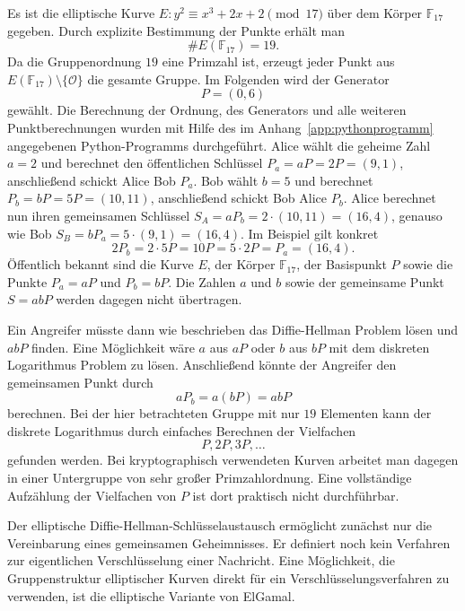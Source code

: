 \begin{beispiel}
    Es ist die elliptische Kurve \(E\colon y^2 \equiv x^3+2x+2 \pmod{17}\) über dem Körper \(\mathbb F_{17}\) gegeben. Durch explizite Bestimmung der Punkte erhält man
    \[
        \#E(\mathbb F_{17})=19.
    \]
    Da die Gruppenordnung \(19\) eine Primzahl ist, erzeugt jeder
    Punkt aus \(E(\mathbb F_{17})\setminus\{\mathcal O\}\) die gesamte
    Gruppe. Im Folgenden wird der Generator
    \[
        P=(0,6)
    \]
    gewählt. Die Berechnung der Ordnung, des Generators und alle weiteren Punktberechnungen wurden mit Hilfe des im Anhang~\ref{app:pythonprogramm} angegebenen Python-Programms durchgeführt. Alice wählt die geheime Zahl $a=2$ und berechnet den öffentlichen Schlüssel $P_a=aP=2P=(9,1)$, anschließend schickt Alice Bob $P_a$. Bob wählt $b=5$ und berechnet $P_b=bP=5P=(10,11)$, anschließend schickt Bob Alice $P_b$. Alice berechnet nun ihren gemeinsamen Schlüssel $S_A=aP_b=2\cdot(10,11)=(16,4)$, genauso wie Bob $S_B=bP_a=5\cdot(9,1)=(16,4)$.  Im Beispiel gilt konkret
    \[
        2P_b=2\cdot5P=10P=5\cdot2P=P_a=(16,4).
    \]
    Öffentlich bekannt sind die Kurve \(E\), der Körper
    \(\mathbb F_{17}\), der Basispunkt \(P\) sowie die Punkte
    \(P_a=aP\) und \(P_b=bP\). Die Zahlen \(a\) und \(b\) sowie der
    gemeinsame Punkt \(S=abP\) werden dagegen nicht übertragen.

    Ein Angreifer müsste dann wie beschrieben das Diffie-Hellman Problem lösen und \(abP\) finden. Eine Möglichkeit wäre \(a\) aus \(aP\) oder \(b\) aus \(bP\) mit dem diskreten Logarithmus Problem zu lösen. Anschließend könnte der Angreifer den gemeinsamen Punkt
    durch
    \[
        aP_b=a(bP)=abP
    \]
    berechnen. Bei der hier betrachteten Gruppe mit nur \(19\) Elementen kann der diskrete Logarithmus durch einfaches Berechnen der Vielfachen
    \[
        P,2P,3P,\ldots
    \]
    gefunden werden. Bei kryptographisch verwendeten Kurven arbeitet man
    dagegen in einer Untergruppe von sehr großer Primzahlordnung. Eine
    vollständige Aufzählung der Vielfachen von \(P\) ist dort praktisch
    nicht durchführbar.
\end{beispiel}
Der elliptische Diffie-Hellman-Schlüsselaustausch ermöglicht zunächst
nur die Vereinbarung eines gemeinsamen Geheimnisses. Er definiert
noch kein Verfahren zur eigentlichen Verschlüsselung einer Nachricht.
Eine Möglichkeit, die Gruppenstruktur elliptischer Kurven direkt für
ein Verschlüsselungsverfahren zu verwenden, ist die elliptische Variante
von ElGamal.


